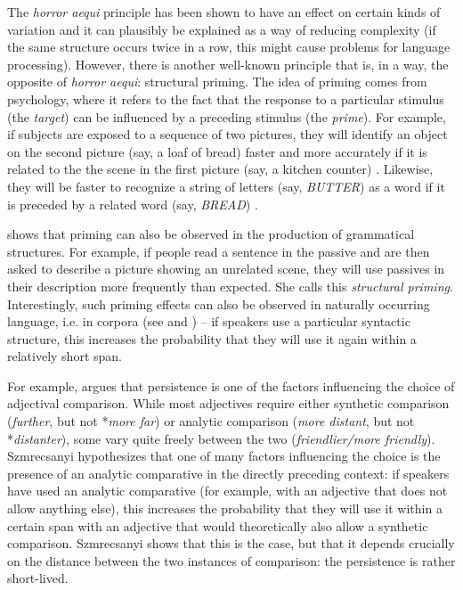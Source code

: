 The \textit{horror aequi}  principle has been shown to have an effect on certain kinds of variation  and it can plausibly be explained as a way of reducing complexity  (if the same structure occurs twice in a row, this might cause problems for language processing). However, there is another well\hyp{}known principle that is, in a way, the opposite of \textit{horror aequi}: structural priming.  The idea of priming  comes from psychology,  where it refers to the fact that the response to a particular stimulus  (the \textit{target}) can be influenced by a preceding stimulus (the \textit{prime}). For example, if subjects are exposed to a sequence of two pictures, they will identify an object on the second picture (say, a loaf of bread) faster and more accurately if it is related to the the scene in the first picture (say, a kitchen counter) \citep[cf.][]{palmer_effects_1975}. Likewise, they will be faster to recognize a string of letters (say, \textit{BUTTER}) as a word if it is preceded by a related word (say, \textit{BREAD}) \citep[cf.][]{meyer_facilitation_1971}.

\citet{bock_syntactic_1986} shows that priming  can also be observed in the production of grammatical  structures. For example, if people read a sentence in the passive  and are then asked to describe a picture showing an unrelated scene, they will use passives in their description more frequently than expected.  She calls this \textit{structural priming}.  Interestingly, such priming effects can also be observed in naturally occurring language, i.e. in corpora (see \citealt{gries_syntactic_2005} and \citealt{szmrecsanyi_language_2005, szmrecsanyi_morphosyntactic_2006}) -- if speakers use a particular syntactic  structure, this increases the probability  that they will use it again within a relatively short  span.

For example, \citet{szmrecsanyi_language_2005} argues that persistence is one of the factors influencing the choice of adjectival  comparison. While most adjectives  require either synthetic comparison (\textit{further}, but not *\textit{more far}) or analytic comparison (\textit{more distant}, but not *\textit{distanter}), some vary quite freely between the two (\textit{friendlier\slash more friendly}). Szmrecsanyi hypothesizes that one of many factors influencing the choice is the presence of an analytic comparative  in the directly preceding context: if speakers have used an analytic comparative (for example, with an adjective  that does not allow anything else), this increases the probability  that they will use it within a certain span  with an adjective  that would theoretically also allow a synthetic comparison. Szmrecsanyi shows that this is the case, but that it depends crucially on the distance between the two instances of comparison: the persistence is rather short\hyp{}lived.

